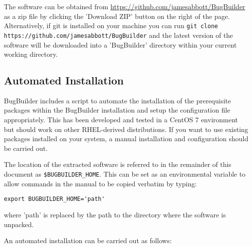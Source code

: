 \documentclass[a4paper,10pt]{article}
\begin{document}
The software can be obtained from
\url{https://github.com/jamesabbott/BugBuilder} as a zip file by clicking the
'Download ZIP' button on the right of the page. Alternatively, if git is
installed on your machine you can run {\tt git clone
https://github.com/jamesabbott/BugBuilder} and the latest version of the
software will be downloaded into a 'BugBuilder' directory within your current
working directory.

\subsection{Automated Installation}\label{sec:autoinstall}

BugBuilder includes a script to automate the installation of the prerequisite
packages within the BugBuilder installation and setup the configuration file
appropriately. This has been developed and tested in a CentOS 7 environment but
should work on other RHEL-derived distributions. If you want to use existing
packages installed on your system, a manual installation and configuration
should be carried out.

The location of the extracted software is referred to in the remainder of this
document as {\tt \$BUGBUILDER\_HOME}. This can be set as an environmental
variable to allow commands in the manual to be copied verbatim by typing:

\begin{verbatim}export BUGBUILDER_HOME='path'\end{verbatim}

where 'path' is replaced by the path to the directory where the software is unpacked.

An automated installation can be carried out as follows:
\end{document}
